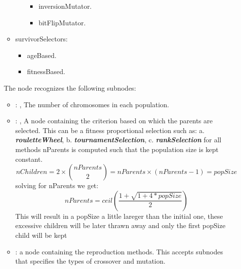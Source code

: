 \begin{itemize}
\begin{itemize}
\begin{itemize}
\begin{itemize}
      \item inversionMutator.
      \item bitFlipMutator.
      \end{itemize}                                                                    \end{itemize}
      \item survivorSelectors:
      \begin{itemize}                                                                        \item
      ageBased.                                                                        \item
      fitnessBased.
      \end{itemize}                                                \end{itemize}

      The  node recognizes the following subnodes:
      \begin{itemize}
        \item {}: , 
          The number of chromosomes in each population.

        \item {}: , 
          A node containing the criterion based on which the parents are selected. This can be a
          fitness proportional selection such as:                   a.
          \textbf{\textit{rouletteWheel}},                   b.
          \textbf{\textit{tournamentSelection}},                   c.
          \textbf{\textit{rankSelection}}                   for all methods nParents is computed
          such that the population size is kept constant.                   \[ nChildren = 2 \times
          {nParents \choose 2} = nParents \times (nParents-1) = popSize \]                   solving
          for nParents we get:                   \[nParents = ceil(\frac{1 +
          \sqrt{1+4*popSize}}{2})\]                   This will result in a popSize a little lareger
          than the initial one, these excessive children will be later thrawn away and only the
          first popSize child will be kept

        \item {}:
          a node containing the reproduction methods.                   This accepts subnodes that
          specifies the types of crossover and mutation.


\end{itemize}
\end{itemize}
